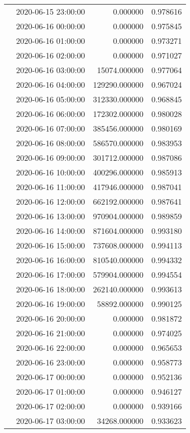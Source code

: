 \begin{tabular}{llrr}
 & 2020-06-15 23:00:00 & 0.000000 & 0.978616 \\
 & 2020-06-16 00:00:00 & 0.000000 & 0.975845 \\
 & 2020-06-16 01:00:00 & 0.000000 & 0.973271 \\
 & 2020-06-16 02:00:00 & 0.000000 & 0.971027 \\
 & 2020-06-16 03:00:00 & 15074.000000 & 0.977064 \\
 & 2020-06-16 04:00:00 & 129290.000000 & 0.967024 \\
 & 2020-06-16 05:00:00 & 312330.000000 & 0.968845 \\
 & 2020-06-16 06:00:00 & 172302.000000 & 0.980028 \\
 & 2020-06-16 07:00:00 & 385456.000000 & 0.980169 \\
 & 2020-06-16 08:00:00 & 586570.000000 & 0.983953 \\
 & 2020-06-16 09:00:00 & 301712.000000 & 0.987086 \\
 & 2020-06-16 10:00:00 & 400296.000000 & 0.985913 \\
 & 2020-06-16 11:00:00 & 417946.000000 & 0.987041 \\
 & 2020-06-16 12:00:00 & 662192.000000 & 0.987641 \\
 & 2020-06-16 13:00:00 & 970904.000000 & 0.989859 \\
 & 2020-06-16 14:00:00 & 871604.000000 & 0.993180 \\
 & 2020-06-16 15:00:00 & 737608.000000 & 0.994113 \\
 & 2020-06-16 16:00:00 & 810540.000000 & 0.994332 \\
 & 2020-06-16 17:00:00 & 579904.000000 & 0.994554 \\
 & 2020-06-16 18:00:00 & 262140.000000 & 0.993613 \\
 & 2020-06-16 19:00:00 & 58892.000000 & 0.990125 \\
 & 2020-06-16 20:00:00 & 0.000000 & 0.981872 \\
 & 2020-06-16 21:00:00 & 0.000000 & 0.974025 \\
 & 2020-06-16 22:00:00 & 0.000000 & 0.965653 \\
 & 2020-06-16 23:00:00 & 0.000000 & 0.958773 \\
 & 2020-06-17 00:00:00 & 0.000000 & 0.952136 \\
 & 2020-06-17 01:00:00 & 0.000000 & 0.946127 \\
 & 2020-06-17 02:00:00 & 0.000000 & 0.939166 \\
 & 2020-06-17 03:00:00 & 34268.000000 & 0.933623 \\

\end{tabular}
